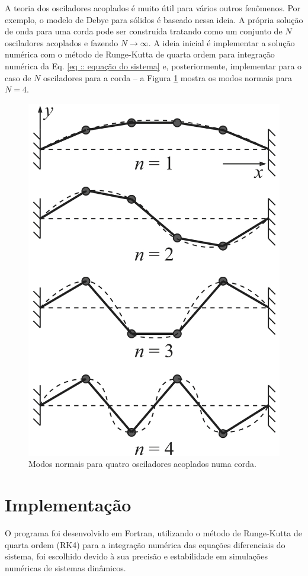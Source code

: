 \documentclass[a4paper, 11pt]{article}
\begin{document}
    A teoria dos osciladores acoplados é muito útil para vários outros fenômenos. Por exemplo, o modelo de Debye para sólidos é baseado nessa ideia. A própria solução de onda para uma corda pode ser construída tratando como um conjunto de $N$ osciladores acoplados e fazendo $N\to\infty$. A ideia inicial é implementar a solução numérica com o método de Runge-Kutta de quarta ordem para integração numérica da Eq. \eqref{eq :: equação do sistema} e, posteriormente, implementar para o caso de $N$ osciladores para a corda -- a Figura \ref{figura :: modos normais para quatro osciladores} mostra os modos normais para $N=4$.

    \begin{figure}[h!]
        \centering
        \includegraphics[width=0.6\linewidth]{modos_normais_para_quatro_osciladores.jpg}
        \caption{Modos normais para quatro osciladores acoplados numa corda.
        \label{figura :: modos normais para quatro osciladores}}
    \end{figure}

\newpage
\section{ Implementação }

    O programa foi desenvolvido em Fortran, utilizando o método de Runge-Kutta de quarta ordem (RK4) para a integração numérica das equações diferenciais do sistema, foi escolhido devido à sua precisão e estabilidade em simulações numéricas de sistemas dinâmicos.
    
\end{document}

